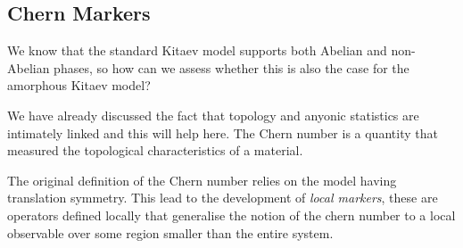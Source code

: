 \hypertarget{chern-markers}{%
\subsection{Chern Markers}\label{chern-markers}}

We know that the standard Kitaev model supports both Abelian and non-Abelian phases, so how can we assess whether this is also the case for the amorphous Kitaev model?

We have already discussed the fact that topology and anyonic statistics are intimately linked and this will help here. The Chern number is a quantity that measured the topological characteristics of a material.

The original definition of the Chern number relies on the model having translation symmetry. This lead to the development of \emph{local markers}, these are operators defined locally that generalise the notion of the chern number to a local observable over some region smaller than the entire system.
